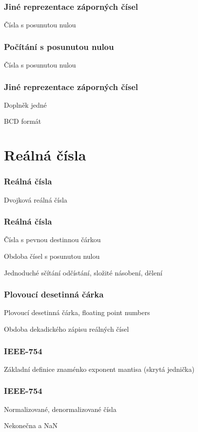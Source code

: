 \documentclass{beamer}
\begin{document}
\begin{frame}
\frametitle{Jiné reprezentace záporných čísel}

Čísla s posunutou nulou
\end{frame}

\begin{frame}
\frametitle{Počítání s posunutou nulou}

Čísla s posunutou nulou
\end{frame}


\begin{frame}
\frametitle{Jiné reprezentace záporných čísel}

Doplněk jedné

BCD formát
\end{frame}


\section{Reálná čísla}


\begin{frame}
\frametitle{Reálná čísla}

Dvojková reálná čísla

\end{frame}


\begin{frame}
\frametitle{Reálná čísla}

Čísla s pevnou destinnou čárkou

Obdoba čísel s posunutou nulou

Jednoduché sčítání odčístání, složité násobení, dělení
\end{frame}

\begin{frame}
\frametitle{Plovoucí desetinná čárka}

Plovoucí desetinná čárka, floating point numbers

Obdoba dekadického zápisu reálných čísel

\end{frame}

\begin{frame}
\frametitle{IEEE-754}

Základní definice znaménko exponent mantisa (skrytá jednička) 
\end{frame}


\begin{frame}
\frametitle{IEEE-754}

Normalizované, denormalizované čísla

Nekonečna a NaN
\end{frame}
\end{document}
